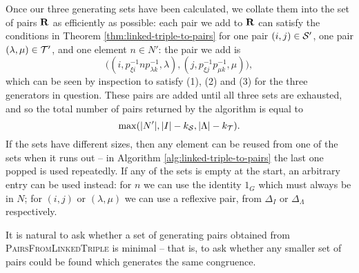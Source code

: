 Once our three generating sets have been calculated, we collate them into the
set of pairs $\mathbf{R}$ as efficiently as possible: each pair we add to $\mathbf{R}$ can
satisfy the conditions in Theorem \ref{thm:linked-triple-to-pairs} for one pair
$(i,j) \in \mathcal{S}'$, one pair $(\lambda, \mu) \in \mathcal{T}'$, and one element
$n \in N'$: the pair we add is
$$\big((i, p_{\xi i}^{-1}np_{\lambda k}^{-1}, \lambda),
(j, p_{\xi j}^{-1}p_{\mu k}^{-1}, \mu)\big),$$
which can be seen by inspection to satisfy (1), (2) and (3) for the three
generators in question.  These pairs are added until all three sets are
exhausted, and so the total number of pairs returned by the algorithm is equal
to
$$\max(|N'|, |I| - k_{\mathcal{S}}, |\Lambda| - k_{\mathcal{T}}).$$
If the sets have different sizes, then any element can be reused from one of
the sets when it runs out -- in Algorithm \ref{alg:linked-triple-to-pairs} the
last one popped is used repeatedly.  If any of the sets is empty at the
start, an arbitrary entry can be used instead: for $n$ we can use the identity
$1_G$ which must always be in $N$; for $(i,j)$ or $(\lambda,\mu)$ we can use a
reflexive pair, from $\Delta_I$ or $\Delta_\Lambda$ respectively.

It is natural to ask whether a set of generating pairs obtained from
\textsc{PairsFromLinkedTriple} is minimal -- that is, to ask whether
any smaller set of pairs could be found which generates the same congruence.

